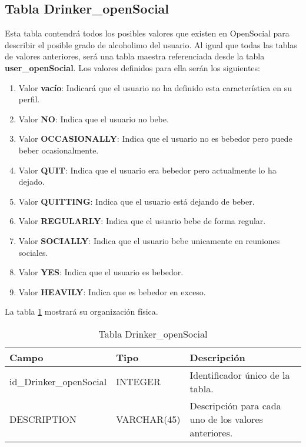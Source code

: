 \subsection{Tabla Drinker\_openSocial}
Esta tabla contendrá todos los posibles valores que existen en OpenSocial para describir el posible grado de alcoholimo del usuario. Al igual que todas las tablas de valores anteriores, será una tabla maestra referenciada desde la tabla \textbf{user\_openSocial}. Los valores definidos para ella serán los siguientes:
\begin{enumerate}
\item Valor \textbf{vacío}: Indicará que el usuario no ha definido esta característica en su perfil.
\item Valor \textbf{NO}: Indica que el usuario no bebe.
\item Valor \textbf{OCCASIONALLY}: Indica que el usuario no es bebedor pero puede beber ocasionalmente.
\item Valor \textbf{QUIT}: Indica que el usuario era bebedor pero actualmente lo ha dejado.
\item Valor \textbf{QUITTING}: Indica que el usuario está dejando de beber.
\item Valor \textbf{REGULARLY}: Indica que el usuario bebe de forma regular.
\item Valor \textbf{SOCIALLY}: Indica que el usuario bebe unicamente en reuniones sociales.
\item Valor \textbf{YES}: Indica que el usuario es bebedor.
\item Valor \textbf{HEAVILY}: Indica que es bebedor en exceso.
\end{enumerate}
\bigskip
\par
La tabla \ref{tabDrinkerOpenSocial} mostrará su organización física.
\bigskip
\par
\begin{table}[h]
\begin{center}
\begin{tabular}{| l | l | p{60mm} |}\hline
\textbf{Campo}&\textbf{Tipo}&\textbf{Descripción} \\ \hline
id\_Drinker\_openSocial & INTEGER & Identificador único de la tabla. \\ \hline
DESCRIPTION & VARCHAR(45) & Descripción para cada uno de los valores anteriores. \\ \hline
\end{tabular}
\end{center}
\caption{Tabla Drinker\_openSocial} \label{tabDrinkerOpenSocial}
\end{table}

